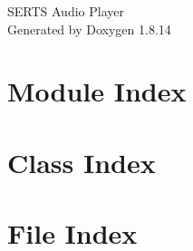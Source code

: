 \documentclass[twoside]{book}
\newcommand{\+}{\discretionary{\mbox{\scriptsize$\hookleftarrow$}}{}{}}
\newcommand{\clearemptydoublepage}{%
  \newpage{\pagestyle{empty}\cleardoublepage}%
}
\begin{document}
\hypersetup{pageanchor=false,
             bookmarksnumbered=true,
             pdfencoding=unicode
            }
\begin{titlepage}
\vspace*{7cm}
\begin{center}%
{\Large S\+E\+R\+TS Audio Player }\\
\vspace*{1cm}
{\large Generated by Doxygen 1.8.14}\\
\end{center}
\end{titlepage}
\clearemptydoublepage
{}
\tableofcontents
\clearemptydoublepage
{}
\hypersetup{pageanchor=true}

\chapter{Module Index}

\chapter{Class Index}

\chapter{File Index}

\end{document}
